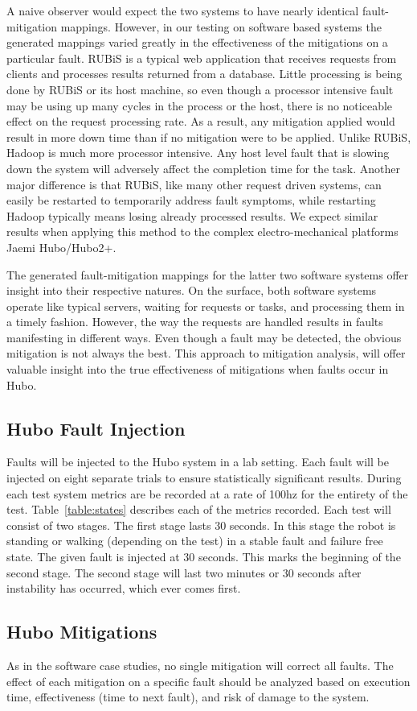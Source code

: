 A naive observer would expect the two systems to have nearly identical
fault-mitigation mappings. However, in our testing on software based systems
the generated mappings varied greatly in the effectiveness of the mitigations
on a particular fault.  RUBiS is a typical web application that receives
requests from clients and processes results returned from a database. Little
processing is being done by RUBiS or its host machine, so even though a
processor intensive fault may be using up many cycles in the process or the
host, there is no noticeable effect on the request processing rate. As a
result, any mitigation applied would result in more down time than if no
mitigation were to be applied. Unlike RUBiS, Hadoop is much more processor
intensive. Any host level fault that is slowing down the system will adversely
affect the completion time for the task. Another major difference is that
RUBiS, like many other request driven systems, can easily be restarted to
temporarily address fault symptoms, while restarting Hadoop typically means
losing already processed results.  We expect similar results when applying this
method to the complex electro-mechanical platforms Jaemi Hubo/Hubo2+.

The generated fault-mitigation mappings for the latter two software systems
offer insight into their respective natures. On the surface, both software
systems operate like typical servers, waiting for requests or tasks, and
processing them in a timely fashion. However, the way the requests are handled
results in faults manifesting in different ways. Even though a fault may be
detected, the obvious mitigation is not always the best. This approach to
mitigation analysis, will offer valuable insight into the true effectiveness of
mitigations when faults occur in Hubo.

\subsection{Hubo Fault Injection}
\label{sec:faultInjection}
Faults will be injected to the Hubo system in a lab setting.  Each fault will
be injected on eight separate trials to ensure statistically significant
results.  During each test system metrics are be recorded at a rate of 100hz
for the entirety of the test.  Table~\ref{table:states} describes each of the
metrics recorded.  Each test will consist of two stages.  The first stage lasts
30 seconds.  In this stage the robot is standing or walking (depending on the
test) in a stable fault and failure free state.  The given fault is injected at
30 seconds.  This marks the beginning of the second stage.  The second stage
will last two minutes or 30 seconds after instability has occurred, which ever
comes first.

\subsection{Hubo Mitigations}
\label{sub:hubomitigations}
As in the software case studies, no single mitigation will correct all
faults. The effect of each mitigation on a specific fault should be analyzed
based on execution time, effectiveness (time to next fault), and risk of damage
to the system.
